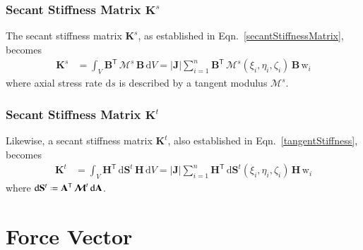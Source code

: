 \subsubsection{Secant Stiffness Matrix $\mathbf{K}^s$}

The secant stiffness matrix $\mathbf{K}^s$, as established in Eqn.~\eqref{secantStiffnessMatrix}, becomes
\begin{equation}
	\begin{aligned}
		\mathbf{K}^s & =\int_{V} \mathbf{B}^{\mathsf{T}} \,  \boldsymbol{\mathcal{M}}^s \, \mathbf{B}  \, \mathrm{d} V
		= |\mathbf{J}| \sum_{i=1}^{n}  \mathbf{B}^{\mathsf{T}} \, \boldsymbol{\mathcal{M}}^s (\xi_i, \eta_i, \zeta_i) \, \mathbf{B} \, \mathrm{w}_i 
	\end{aligned}
\end{equation} 
where axial stress rate $\mathrm{d} s$ is described by a tangent modulus $\boldsymbol{\mathcal{M}}^{s}$.


\subsubsection{Secant Stiffness Matrix $\mathbf{K}^t$}

Likewise, a secant stiffness matrix $\mathbf{K}^t$, also established in Eqn.~\eqref{tangentStiffness}, becomes 
\begin{equation} 
	\begin{aligned}
		\mathbf{K}^t & = \int_{V} \mathbf{H}^{\mathsf{T}} \,  \mathrm{d} \mathbf{S}^t \, \mathbf{H}  \,  \mathrm{d} V
		= | \mathbf{J} | \sum_{i=1}^{n}  \mathbf{H}^{\mathsf{T}} \,  \mathrm{d} \mathbf{S}^t (\xi_i, \eta_i, \zeta_i) \, \mathbf{H} \, \mathrm{w}_i 
	\end{aligned}
\end{equation}
where $\mathrm{d} \mathbf{S}^t \defeq \mathbf{A}^{\mathsf{T}} \, \boldsymbol{\mathcal{M}}^t \, \mathrm{d} \mathbf{A}$.




\section{Force Vector}
\label{secForceVectors}




